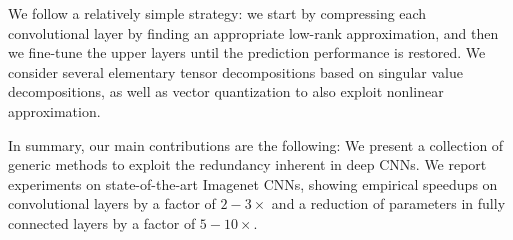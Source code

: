 We follow a relatively simple strategy: we start by compressing each 
convolutional layer by finding an appropriate low-rank approximation, 
and then we fine-tune the upper layers until the prediction performance 
is restored. We consider several elementary tensor decompositions based 
on singular value decompositions, as well as vector quantization to 
also exploit nonlinear approximation. 

In summary, our main contributions are the following:
We present a collection of generic methods to exploit the redundancy inherent in deep CNNs.
We report experiments on state-of-the-art Imagenet CNNs, showing empirical speedups on 
convolutional layers by a factor of $2-3\times$ and a reduction of parameters in fully connected layers by a factor of $5-10\times$.





